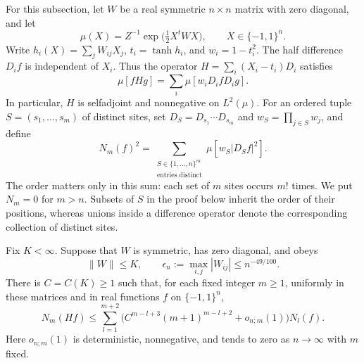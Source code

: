 For this subsection, let $W$ be a real symmetric $n\times n$ matrix with zero
diagonal, and let
\[
 \mu(X)=Z^{-1}\exp\bigl(\tfrac12 X^tWX\bigr),
 \qquad X\in\{-1,1\}^n.
\]
Write $h_i(X)=\sum_jW_{ij}X_j$, $t_i=\tanh h_i$, and $w_i=1-t_i^2$.
The half difference $D_i f$ is independent of $X_i$.  Thus the operator
$H=\sum_i(X_i-t_i)D_i$ satisfies
\begin{equation}
 \mu[fHg]=\sum_i\mu[w_iD_ifD_ig].
 \label{eq:micro-discrete-form}
\end{equation}
In particular, $H$ is selfadjoint and nonnegative on $L^2(\mu)$.
For an ordered tuple $S=(s_1,\ldots,s_m)$ of distinct sites, set
$D_S=D_{s_1}\cdots D_{s_m}$ and $w_S=\prod_{j\in S}w_j$, and define
\[
 N_m(f)^2=\sum_{\substack{S\in\{1,\ldots,n\}^m\\
                         \text{entries distinct}}}
                 \mu[w_S|D_Sf|^2].
\]
The order matters only in this sum: each set of $m$ sites occurs $m!$ times.
We put $N_m=0$ for $m>n$.  Subsets of $S$ in the proof below inherit the order
of their positions, whereas unions inside a difference operator denote the
corresponding collection of distinct sites.

\begin{lemma}
\label{lem:micro-weighted-recursion}
Fix $K<\infty$.  Suppose that $W$ is symmetric, has zero diagonal, and obeys
\[
 \|W\|\le K,\qquad \epsilon_n:=\max_{i,j}|W_{ij}|\le n^{-49/100}.
\]
There is $C=C(K)\ge1$ such that, for each fixed integer $m\ge1$, uniformly
in these matrices and in real functions $f$ on $\{-1,1\}^n$,
\begin{equation}
 N_m(Hf)\le\sum_{l=1}^{m+2}
 \bigl(C^{m-l+3}(m+1)^{m-l+2}+o_{n;m}(1)\bigr)N_l(f).
 \label{eq:source-35}
\end{equation}
Here $o_{n;m}(1)$ is deterministic, nonnegative, and tends to zero as
$n\to\infty$ with $m$ fixed.
\end{lemma}

